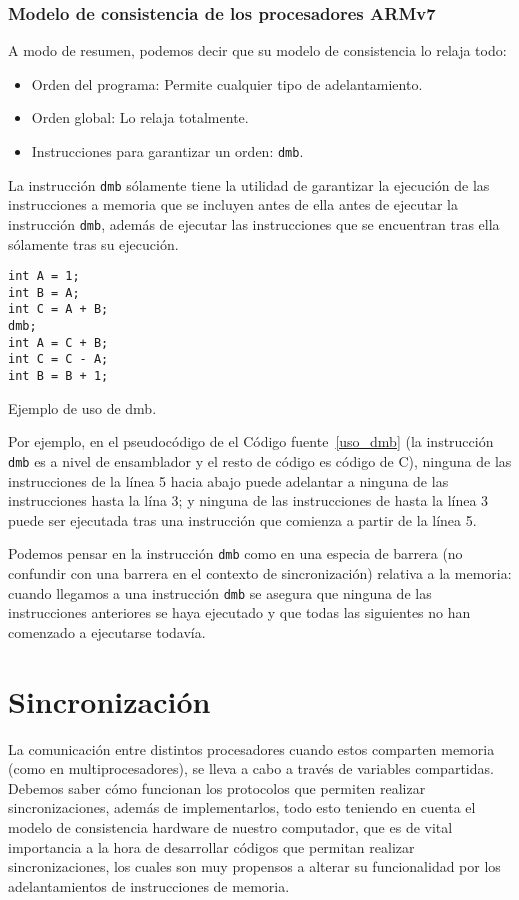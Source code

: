 \subsubsection{Modelo de consistencia de los procesadores ARMv7}
A modo de resumen, podemos decir que su modelo de consistencia lo relaja todo:
\begin{itemize}
    \item Orden del programa: Permite cualquier tipo de adelantamiento.
    \item Orden global: Lo relaja totalmente.
    \item Instrucciones para garantizar un orden: \verb|dmb|.
\end{itemize}
La instrucción \verb|dmb| sólamente tiene la utilidad de garantizar la ejecución de las instrucciones a memoria que se incluyen antes de ella antes de ejecutar la instrucción \verb|dmb|, además de ejecutar las instrucciones que se encuentran tras ella sólamente tras su ejecución.
\begin{listing}[H]
\centering
\begin{verbatim}
int A = 1;
int B = A;
int C = A + B;
dmb;
int A = C + B;
int C = C - A;
int B = B + 1;
\end{verbatim}
\caption{Ejemplo de uso de dmb.}
\label{uso_dmb}
\end{listing}
Por ejemplo, en el pseudocódigo de el Código fuente~\ref{uso_dmb} (la instrucción \verb|dmb| es a nivel de ensamblador y el resto de código es código de C), ninguna de las instrucciones de la línea 5 hacia abajo puede adelantar a ninguna de las instrucciones hasta la lína 3; y ninguna de las instrucciones de hasta la línea 3 puede ser ejecutada tras una instrucción que comienza a partir de la línea 5.

Podemos pensar en la instrucción \verb|dmb| como en una especia de barrera (no confundir con una barrera en el contexto de sincronización) relativa a la memoria: cuando llegamos a una instrucción \verb|dmb| se asegura que ninguna de las instrucciones anteriores se haya ejecutado y que todas las siguientes no han comenzado a ejecutarse todavía.


\newpage
\section{Sincronización}
La comunicación entre distintos procesadores cuando estos comparten memoria (como en multiprocesadores), se lleva a cabo a través de variables compartidas. Debemos saber cómo funcionan los protocolos que permiten realizar sincronizaciones, además de implementarlos, todo esto teniendo en cuenta el modelo de consistencia hardware de nuestro computador, que es de vital importancia a la hora de desarrollar códigos que permitan realizar sincronizaciones, los cuales son muy propensos a alterar su funcionalidad por los adelantamientos de instrucciones de memoria.

